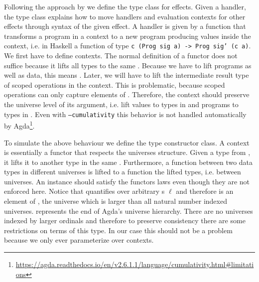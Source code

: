 Following the approach by \citeauthor{DBLP:conf/haskell/WuSH14} we define the
 type class for effects.
Given a handler, the type class explains how to move handlers and evaluation contexts
for other effects through syntax of the given effect.
A handler is given by a function that transforms a program in a context to a new
program producing values inside the context, i.e. in Haskell a function of type
\texttt{c (Prog sig a) -> Prog sig' (c a)}.
We first have to define contexts.
The normal definition of a functor does not suffice because it lifts all types
to the same .
Because we have to lift programs as well as data, this means .
Later, we will have to lift the intermediate result type of scoped operations in
the context.
This is problematic, because scoped operations can only capture elements of
.
Therefore, the context should preserve the universe level of its argument, i.e.
lift values to types in  and programs to types in
.
Even with \texttt{--cumulativity} this behavior is not handled automatically by
Agda\footnote{\url{https://agda.readthedocs.io/en/v2.6.1.1/language/cumulativity.html\#limitations}}.

To simulate the above behaviour we define the  type
constructor class.
A context is essentially a functor that respects the universes structure.
Given a type from , it lifts it to another type in the same
.
Furthermore, a function between two data types in different universes is
lifted to a function the lifted types, i.e. between universes.
An instance should satisfy the functors laws even though they are not enforced
here.
Notice that  quantifies over arbitrary
s $\ell$ and therefore is an element of ,
the universe which is larger than all natural number indexed universes.
 represents the end of Agda's universe hierarchy.
There are no universes indexed by larger ordinals and therefore to preserve
consistency there are some restrictions on terms of this type.
In our case this should not be a problem because we only ever parameterize over
contexts.

